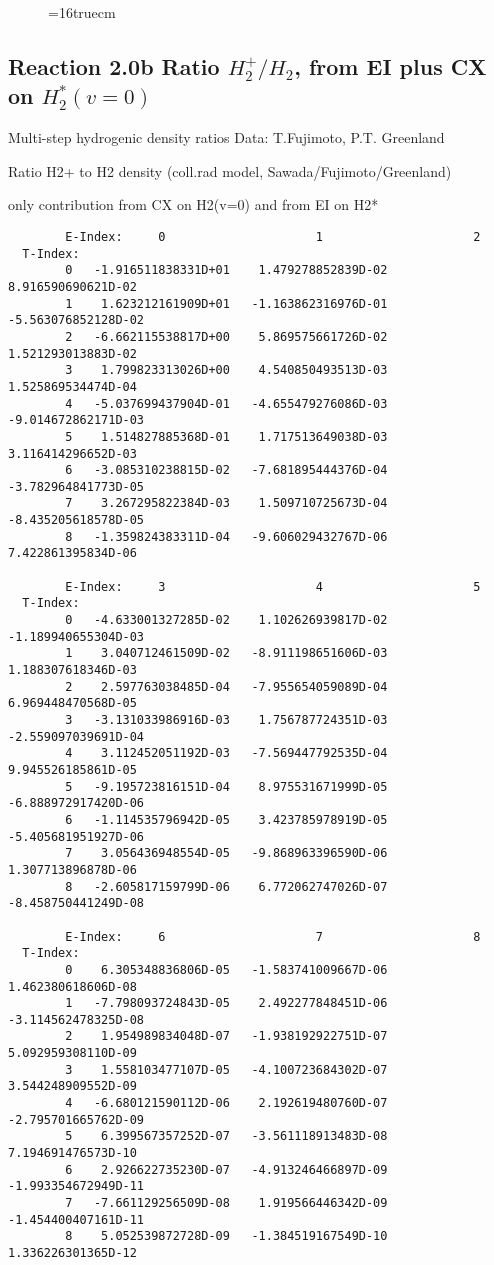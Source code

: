 \documentclass[12pt]{article}
\begin{document}
\begin{figure} \label{7.2e}
\epsfxsize=16truecm
\end{figure}
\newpage

\subsection{
Reaction 2.0b Ratio $H_2^+/H_2$, from EI plus CX on $H_2^*(v=0)$
}

 Multi-step hydrogenic density ratios
 Data: T.Fujimoto, P.T. Greenland


  Ratio H2+ to H2 density
  (coll.rad model, Sawada/Fujimoto/Greenland)

  only contribution from  CX on H2(v=0) and from EI on H2*


\begin{small}\begin{verbatim}
        E-Index:     0                     1                     2
  T-Index:
        0   -1.916511838331D+01    1.479278852839D-02    8.916590690621D-02
        1    1.623212161909D+01   -1.163862316976D-01   -5.563076852128D-02
        2   -6.662115538817D+00    5.869575661726D-02    1.521293013883D-02
        3    1.799823313026D+00    4.540850493513D-03    1.525869534474D-04
        4   -5.037699437904D-01   -4.655479276086D-03   -9.014672862171D-03
        5    1.514827885368D-01    1.717513649038D-03    3.116414296652D-03
        6   -3.085310238815D-02   -7.681895444376D-04   -3.782964841773D-05
        7    3.267295822384D-03    1.509710725673D-04   -8.435205618578D-05
        8   -1.359824383311D-04   -9.606029432767D-06    7.422861395834D-06

        E-Index:     3                     4                     5
  T-Index:
        0   -4.633001327285D-02    1.102626939817D-02   -1.189940655304D-03
        1    3.040712461509D-02   -8.911198651606D-03    1.188307618346D-03
        2    2.597763038485D-04   -7.955654059089D-04    6.969448470568D-05
        3   -3.131033986916D-03    1.756787724351D-03   -2.559097039691D-04
        4    3.112452051192D-03   -7.569447792535D-04    9.945526185861D-05
        5   -9.195723816151D-04    8.975531671999D-05   -6.888972917420D-06
        6   -1.114535796942D-05    3.423785978919D-05   -5.405681951927D-06
        7    3.056436948554D-05   -9.868963396590D-06    1.307713896878D-06
        8   -2.605817159799D-06    6.772062747026D-07   -8.458750441249D-08

        E-Index:     6                     7                     8
  T-Index:
        0    6.305348836806D-05   -1.583741009667D-06    1.462380618606D-08
        1   -7.798093724843D-05    2.492277848451D-06   -3.114562478325D-08
        2    1.954989834048D-07   -1.938192922751D-07    5.092959308110D-09
        3    1.558103477107D-05   -4.100723684302D-07    3.544248909552D-09
        4   -6.680121590112D-06    2.192619480760D-07   -2.795701665762D-09
        5    6.399567357252D-07   -3.561118913483D-08    7.194691476573D-10
        6    2.926622735230D-07   -4.913246466897D-09   -1.993354672949D-11
        7   -7.661129256509D-08    1.919566446342D-09   -1.454400407161D-11
        8    5.052539872728D-09   -1.384519167549D-10    1.336226301365D-12


\end{verbatim}
\end{small}
\end{document}
